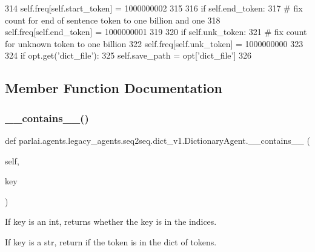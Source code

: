 \begin{DoxyCode}
314                 self.freq[self.start\_token] = 1000000002
315 
316             \textcolor{keywordflow}{if} self.end\_token:
317                 \textcolor{comment}{# fix count for end of sentence token to one billion and one}
318                 self.freq[self.end\_token] = 1000000001
319 
320             \textcolor{keywordflow}{if} self.unk\_token:
321                 \textcolor{comment}{# fix count for unknown token to one billion}
322                 self.freq[self.unk\_token] = 1000000000
323 
324             \textcolor{keywordflow}{if} opt.get(\textcolor{stringliteral}{'dict\_file'}):
325                 self.save\_path = opt[\textcolor{stringliteral}{'dict\_file'}]
326 
\end{DoxyCode}


\subsection{Member Function Documentation}
\mbox{\label{classparlai_1_1agents_1_1legacy__agents_1_1seq2seq_1_1dict__v1_1_1DictionaryAgent_ae9ff07246d32352244a121ef76789970}} 
\subsubsection{\texorpdfstring{\+\_\+\+\_\+contains\+\_\+\+\_\+()}{\_\_contains\_\_()}}
{\footnotesize\ttfamily def parlai.\+agents.\+legacy\+\_\+agents.\+seq2seq.\+dict\+\_\+v1.\+Dictionary\+Agent.\+\_\+\+\_\+contains\+\_\+\+\_\+ (\begin{DoxyParamCaption}\item[{}]{self,  }\item[{}]{key }\end{DoxyParamCaption})}

\begin{DoxyVerb}If key is an int, returns whether the key is in the indices.

If key is a str, return if the token is in the dict of tokens.
\end{DoxyVerb}
 

